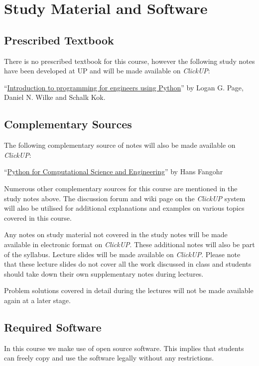 \section{Study Material and Software}
    \subsection{Prescribed Textbook}
        There is no prescribed textbook for this course, however the following
        study notes have been developed at UP and will be made available on
        {\it ClickUP}:

        ``\underline{Introduction to programming for engineers using Python}''
        by Logan G. Page, Daniel N. Wilke and Schalk Kok.

    \subsection{Complementary Sources}
        The following complementary source of notes will also be made available
        on {\it ClickUP}:

        ``\underline{Python for Computational Science and Engineering}'' by
        Hans Fangohr

        Numerous other complementary sources for this course are mentioned in
        the study notes above. The discussion forum and wiki page on the
        {\it ClickUP} system will also be utilised for additional explanations and
        examples on various topics covered in this course.

        Any notes on study material not covered in the study notes will be made
        available in electronic format on {\it ClickUP}. These additional notes will
        also be part of the syllabus. Lecture slides will be made available on
        {\it ClickUP}. Please note that these lecture slides do not cover all the
        work discussed in class and students should take down their own
        supplementary notes during lectures.

        Problem solutions covered in detail during the lectures will not be
        made available again at a later stage.

    \subsection{Required Software}
        In this course we make use of open source software. This implies
        that students can freely copy and use the software legally
        without any restrictions.

